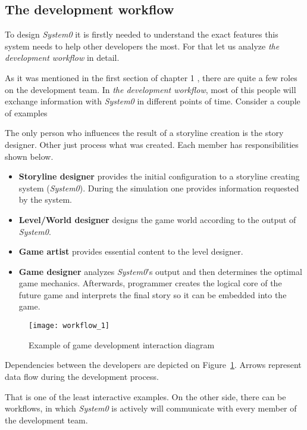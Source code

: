 \subsection{The development workflow}
To design \textit{System0} it is firstly needed to understand the exact features this system needs to help other developers the most. For that let us analyze \textit{the development workflow} in detail.\par
As it was mentioned in the first section of chapter 1 , there are quite a few roles on the development team.
In \textit{the development workflow}, most of this people will exchange information with \textit{System0} in different points of time. Consider a couple of examples
\begin{example}
The only person who influences the result of a storyline creation is the story designer.  Other just process what was created. Each member has responsibilities shown below.
\begin{itemize}
 \item \textbf{Storyline designer} provides the initial configuration to a storyline creating system (\textit{System0}). During the simulation one provides information requested by the system.
 \item \textbf{Level/World designer} designs the game world according to the output of \textit{System0}.
 \item \textbf{Game artist} provides essential content to the level designer.
 \item \textbf{Game designer} analyzes \textit{System0}'s output and then determines the optimal game mechanics. Afterwards, programmer creates the logical core of the future game and interprets the final story so it can be embedded into the game.
\end{itemize}
    \begin{figure}[h!]
     \begin{center}
      \texttt{[image: workflow\_1]}
      \caption{Example of game development interaction diagram }
      \label{SimpleWorkflow}
     \end{center}
    \end{figure}
Dependencies between the developers are depicted on Figure~\ref{SimpleWorkflow}. Arrows represent data flow during the development process.
\end{example}

That is one of the least interactive examples. On the other side, there can be workflows, in which \textit{System0} is actively will communicate with every member of the development team.

